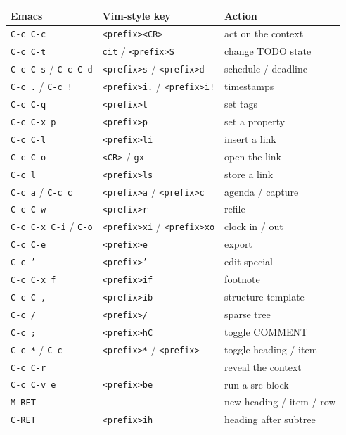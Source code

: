 \begin{center}
\begin{tabular}{lll}
Emacs & Vim-style key & Action\\
\hline
\texttt{C-c C-c} & \texttt{<prefix><CR>} & act on the context\\
\texttt{C-c C-t} & \texttt{cit} / \texttt{<prefix>S} & change TODO state\\
\texttt{C-c C-s} / \texttt{C-c C-d} & \texttt{<prefix>s} / \texttt{<prefix>d} & schedule / deadline\\
\texttt{C-c .} / \texttt{C-c !} & \texttt{<prefix>i.} / \texttt{<prefix>i!} & timestamps\\
\texttt{C-c C-q} & \texttt{<prefix>t} & set tags\\
\texttt{C-c C-x p} & \texttt{<prefix>p} & set a property\\
\texttt{C-c C-l} & \texttt{<prefix>li} & insert a link\\
\texttt{C-c C-o} & \texttt{<CR>} / \texttt{gx} & open the link\\
\texttt{C-c l} & \texttt{<prefix>ls} & store a link\\
\texttt{C-c a} / \texttt{C-c c} & \texttt{<prefix>a} / \texttt{<prefix>c} & agenda / capture\\
\texttt{C-c C-w} & \texttt{<prefix>r} & refile\\
\texttt{C-c C-x C-i} / \texttt{C-o} & \texttt{<prefix>xi} / \texttt{<prefix>xo} & clock in / out\\
\texttt{C-c C-e} & \texttt{<prefix>e} & export\\
\texttt{C-c '} & \texttt{<prefix>'} & edit special\\
\texttt{C-c C-x f} & \texttt{<prefix>if} & footnote\\
\texttt{C-c C-,} & \texttt{<prefix>ib} & structure template\\
\texttt{C-c /} & \texttt{<prefix>/} & sparse tree\\
\texttt{C-c ;} & \texttt{<prefix>hC} & toggle COMMENT\\
\texttt{C-c *} / \texttt{C-c -} & \texttt{<prefix>*} / \texttt{<prefix>-} & toggle heading / item\\
\texttt{C-c C-r} &  & reveal the context\\
\texttt{C-c C-v e} & \texttt{<prefix>be} & run a src block\\
\texttt{M-RET} &  & new heading / item / row\\
\texttt{C-RET} & \texttt{<prefix>ih} & heading after subtree\\
\end{tabular}
\end{center}

